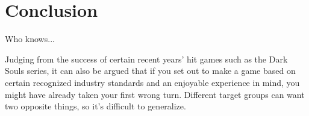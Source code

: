 \chapter{Conclusion}

Who knows... 

Judging from the success of certain recent years' hit games such as the Dark Souls series, it can also be argued that if you set out to make a game based on certain recognized industry standards and an enjoyable experience in mind, you might have already taken your first wrong turn. Different target groups can want two opposite things, so it's difficult to generalize.
